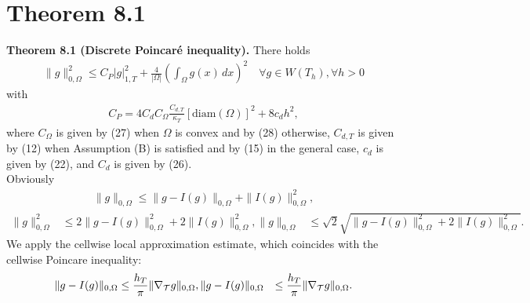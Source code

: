 \documentclass[10pt,a4paper]{article}
\begin{document}
\section*{Theorem 8.1}

\noindent \textbf{Theorem 8.1 (Discrete Poincaré inequality).} There holds
\begin{align*}
    \|g\|^2_{0,\Omega} 
    \leq 
    C_P |g|^2_{1,T} 
    + 
    \frac{4}{|\Omega|} \left( \int_{\Omega} g(x) \, dx \right)^2
        \quad 
    \forall g \in W(T_h), \forall h > 0
\end{align*}
with
\begin{align*}
C_P = 4C_d C_\Omega \frac{C_{d,T}}{\kappa_T} [\text{diam}(\Omega)]^2 + 8c_d h^2,
\end{align*}
where \(C_\Omega\) is given by (27) when \(\Omega\) is convex and by (28) otherwise, \(C_{d,T}\) is given by (12) when Assumption (B) is satisfied and by (15) in the general case, \(c_d\) is given by (22), and \(C_d\) is given by (26).
\\

\noindent Obviously
\begin{align*}
    \|g\|_{0,\Omega} 
    \leq 
    \|g - I(g)\|_{0,\Omega} + \|I(g)\|^2_{0,\Omega}
    ,
\end{align*}
\begin{align*}
    \|g\|^2_{0,\Omega} 
    &\leq 
    2\|g - I(g)\|^2_{0,\Omega} + 2\|I(g)\|^2_{0,\Omega} 
    ,
    \|g\|_{0,\Omega} 
    &\leq
    \sqrt{2}
    \sqrt{ \|g - I(g)\|^2_{0,\Omega} + 2\|I(g)\|^2_{0,\Omega} }
    .
\end{align*}
We apply the cellwise local approximation estimate, which coincides with the cellwise Poincare inequality:
\begin{align*}
    \|g - I(g)\|_{0,\Omega}
    &\leq 
    \frac{ h_T }{\pi}
    \| \nabla_{\mathcal T} g \|_{0,\Omega}
    ,
    \|g - I(g)\|_{0,\Omega}
    &\leq 
    \frac{ h_T }{\pi}
    \| \nabla_{\mathcal T} g \|_{0,\Omega}
    .
\end{align*}
\end{document}
